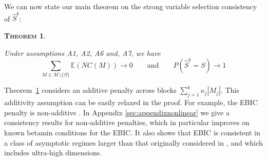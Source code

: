 \documentclass[aos]{imsart}
\theoremstyle{plain}
\newtheorem{thm}{\textsc{Theorem}}[section]
\newcommand{\paul}[1]{{\small{\color{green} \sf $\spadesuit$ Paul: #1}}}
\newcommand{\E}{\mathbb{E}}
\newcommand{\bs}{\boldsymbol}
\begin{document}
We can now state our main theorem on the strong variable selection consistency of $\hat{S}^{b}$:
\begin{thm}\label{theo:suffcondlinearmodel}

Under assumptions A1, A2, A6 and, A7, we have
$$\sum_{M \in \mathcal{M}\setminus \{S\}}\E\left(NC(M)\right)\to 0 \qquad \mbox{and} \qquad P(\hat{S}^b = S) \to 1$$
\end{thm}



Theorem~\ref{theo:suffcondlinearmodel} considers an additive penalty across blocks
$\sum_{j=1}^b \kappa_j|M_j|$. This additivity assumption can be easily relaxed in the proof. 
For example, the EBIC penalty is non-additive \citep{EBIC}.
In Appendix \ref{sec:appendixnonlinear} we give a consistency results for non-additive penalties, which in particular improves on known betamin conditions for the EBIC.
It also shows that EBIC is consistent in a class of asymptotic regimes larger than that originally considered in \cite{EBIC}, and which includes ultra-high dimensions.
\end{document}

